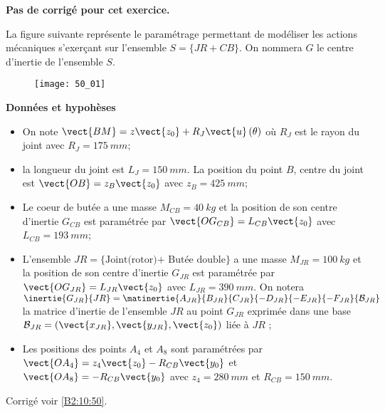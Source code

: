 \normaltrue \difficilefalse \tdifficilefalse
\correctionfalse


\setcounter{numques}{0}
\ifcorrection
\else
\textbf{Pas de corrigé pour cet exercice.}
\fi


\ifprof
\else
La figure suivante représente le paramétrage permettant de modéliser les actions mécaniques
s’exerçant sur l’ensemble $S=\{JR+CB\}$. On nommera $G$ le centre d’inertie de l’ensemble
$S$.


\begin{figure}[H]
\centering
\texttt{[image: 50\_01]}
\end{figure}
\fi


\ifprof
\else
\textbf{Données et hypohèses}

\begin{itemize}
\item On note $\vect{BM}=z\vect{z_0}+R_J\vect{u}\left(\theta\right)$ où $R_J$ est le rayon du joint avec $R_J = \SI{175}{mm}$;
\item la longueur du joint est $L_J = \SI{150}{mm}$. La position du point $B$, centre du joint est $\vect{OB}=z_B\vect{z_0}$ avec $z_B = \SI{425}{mm}$;
\item Le coeur de butée a une masse $M_{CB} = \SI{40}{kg}$ et la position de son centre d’inertie $G_{CB}$ est paramétrée par $\vect{OG_{CB}}= L_{CB}\vect{z_0}$ avec $L_{CB} = \SI{193}{mm}$;
\item L’ensemble $JR=\{\text{Joint(rotor)+ Butée double}\}$ a une masse $M_{JR} = \SI{100}{kg}$ et la
position de son centre d’inertie $G_{JR}$ est paramétrée par $\vect{OG_{JR}}=L_{JR}\vect{z_0}$ avec $L_{JR}=
\SI{390}{mm}$. On notera $\inertie{G_{JR}}{JR} = \matinertie{A_{JR}}{B_{JR}}{C_{JR}}{-D_{JR}}{-E_{JR}}{-F_{JR}}{\mathcal{B}_{JR}}$ la matrice d’inertie de l’ensemble $JR$ au point $G_{JR}$ exprimée dans une base $\mathcal{B}_{JR} = \left(\vect{x_{JR}},\vect{y_{JR}},\vect{z_{0}}\right)$ liée à $JR$ ;
\item Les positions des points $A_4$ et $A_8$ sont paramétrées par $\vect{OA_4} = z_4\vect{z_0}-R_{CB}\vect{y_0}$ et
$\vect{OA_8}=-R_{CB}\vect{y_0}$ avec $z_4 = \SI{280}{mm}$ et $R_{CB}=\SI{150}{mm}$.
\end{itemize}
\fi

\ifprof
\else
\fi


\ifprof
\else
\fi



\ifprof
\else
\begin{flushright}
\footnotesize{Corrigé voir \ref{B2:10:50}.}
\end{flushright}%
\fi